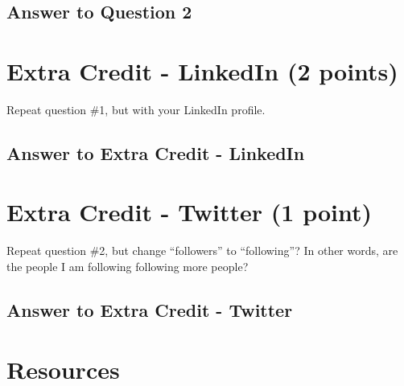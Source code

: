 \documentclass{article}
\begin{document}
\subsection*{Answer to Question 2}


\clearpage

\section*{Extra Credit - LinkedIn (2 points)}

Repeat question \#1, but with your LinkedIn profile.

\subsection*{Answer to Extra Credit - LinkedIn}

\clearpage

\section*{Extra Credit - Twitter (1 point)}

Repeat question \#2, but change ``followers'' to ``following''? In other words, are the people I am following following more people?

\subsection*{Answer to Extra Credit - Twitter}

\clearpage

\section*{Resources}
\end{document}
